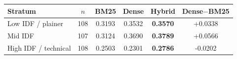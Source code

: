 \begin{tabular}{lSSSSS}
\toprule
\textbf{Stratum} & \textbf{$n$} & \textbf{BM25} & \textbf{Dense} & \textbf{Hybrid} & \textbf{Dense$-$BM25} \\
\midrule
Low IDF / plainer & 108 & 0.3193 & 0.3532 & \textbf{0.3570} & +0.0338 \\
Mid IDF & 107 & 0.3124 & 0.3690 & \textbf{0.3789} & +0.0566 \\
High IDF / technical & 108 & 0.2503 & 0.2301 & \textbf{0.2786} & -0.0202 \\
\bottomrule
\end{tabular}
